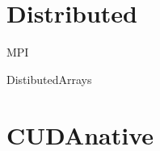 \documentclass{beamer}
\begin{document}
\section{Distributed}
\begin{frame}
  MPI
\end{frame}
\begin{frame}
  DistibutedArrays
\end{frame}
\section{CUDAnative}
\end{document}

